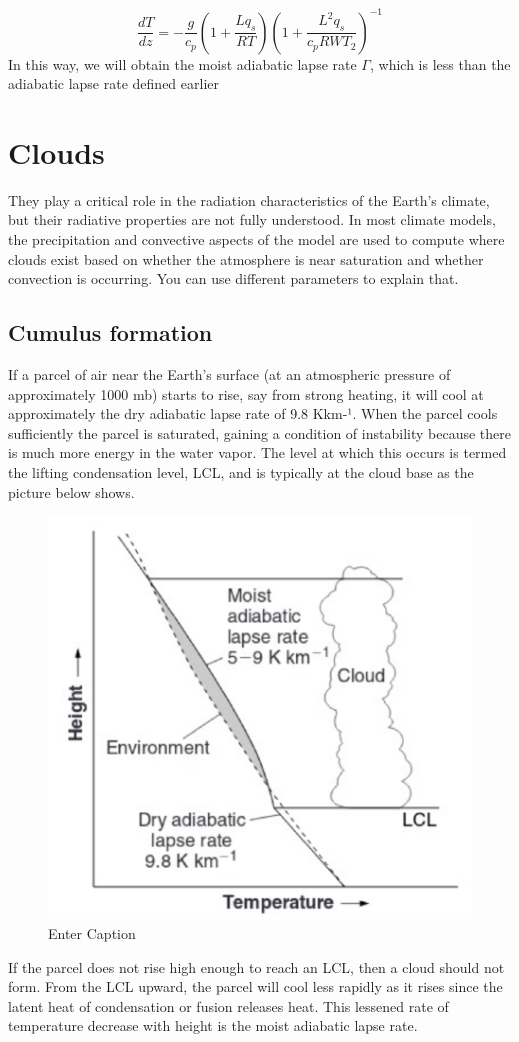 $$\frac{dT}{dz} = -\frac{g}{c_p} \left( 1 + \frac{L q_s}{R T} \right) \left( 1 + \frac{L^2 q_s}{c_p R W T_2} \right)^{-1}$$
In this way, we will obtain the moist adiabatic lapse rate $\Gamma$, which is less than the adiabatic lapse rate defined earlier

\section{Clouds}
They play a critical role in the radiation characteristics of the Earth's climate, but their radiative properties are not fully understood. In most climate models, the precipitation and convective aspects of the model are used to compute where clouds exist based on whether the atmosphere is near saturation and whether convection is occurring. You can use different parameters to explain that.

\subsection{Cumulus formation}
If a parcel of air near the Earth's surface (at an atmospheric pressure of approximately 1000 mb) starts to rise, say from strong heating, it will cool at approximately the dry adiabatic lapse rate of 9.8 Kkm-¹. When the parcel cools sufficiently the parcel is saturated, gaining a condition of instability because there is much more energy in the water vapor. The level at which this occurs is termed the lifting condensation level, LCL, and is typically at the cloud base as the picture below shows.
\begin{figure}[h!]
	\centering
	\includegraphics[width=0.5\linewidth]{uploads/image14.png}
	\caption{Enter Caption}
	\label{fig:enter-label}
\end{figure}
If the parcel does not rise high enough to reach an LCL, then a cloud should not form. From the LCL upward, the parcel will cool less rapidly as it rises since the latent heat of condensation or fusion releases heat. This lessened rate of temperature decrease with height is the moist adiabatic lapse rate.

